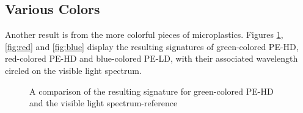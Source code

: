 \subsection{Various Colors}
Another result is from the more colorful pieces of microplastics. Figures \ref{fig:green}, \ref{fig:red} and \ref{fig:blue} display the resulting signatures of green-colored PE-HD, red-colored PE-HD and blue-colored PE-LD, with their associated wavelength circled on the visible light spectrum.  
\begin{figure}[H]
  \newcommand*\FigVSkip{0.5em}
  \newcommand*\FigHSkip{0.1em}
  \newsavebox\FigBox
  \centering
  \begin{minipage}{\wd\FigBox}
    \centering\usebox{\FigBox}
  \end{minipage}
  \begin{minipage}{\wd\FigBox}
    \centering\usebox{\FigBox}
  \end{minipage}
  \caption{A comparison of the resulting signature for green-colored PE-HD and the visible light spectrum-reference}
  \label{fig:green}
\end{figure}

